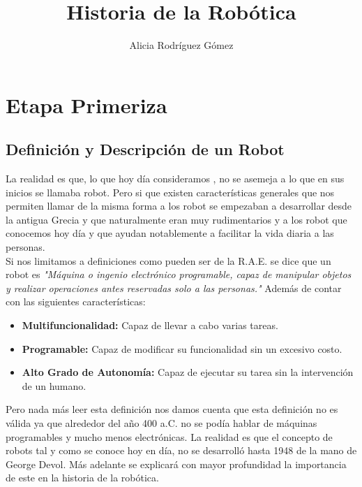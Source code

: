\documentclass[paper=a4, fontsize=11pt]{scrartcl}
\begin{document}
\title{Historia de la Robótica}
\author{Alicia Rodríguez Gómez}

\maketitle

\tableofcontents

\newpage

\section{Etapa Primeriza}




\subsection{Definición y Descripción de un Robot}


La realidad es que, lo que hoy día consideramos , no se asemeja a lo que en sus inicios se llamaba robot. Pero si que existen características generales que nos permiten llamar de la misma forma a los robot se empezaban a desarrollar desde la antigua Grecia y que naturalmente eran muy rudimentarios y a los robot que conocemos hoy día y que ayudan notablemente a facilitar la vida diaria a las personas.\\

Si nos limitamos a definiciones como pueden ser de la R.A.E. se dice que un robot es \textit{"Máquina o ingenio electrónico programable, capaz de manipular objetos y realizar operaciones antes reservadas solo a las personas."} Además de contar con las siguientes características:

\begin{itemize}
\item \textbf{Multifuncionalidad:} Capaz de llevar a cabo varias tareas.
\item \textbf{Programable:} Capaz de modificar su funcionalidad sin un excesivo costo.
\item \textbf{Alto Grado de Autonomía:} Capaz de ejecutar su tarea sin la intervención de un humano.
\end{itemize}

Pero nada más leer esta definición nos damos cuenta que esta definición no es válida ya que alrededor del año 400 a.C. no se podía hablar de máquinas programables y mucho menos electrónicas. La realidad es que el concepto de robots tal y como se conoce hoy en día, no se desarrolló hasta 1948 de la mano de George Devol. Más adelante se explicará con mayor profundidad la importancia de este en la historia de la robótica.
\end{document}
